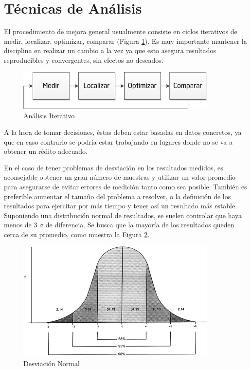 \documentclass[a4paper]{report}
\begin{document}
\section{Técnicas de Análisis}

El procedimiento de mejora general usualmente consiste en ciclos iterativos de medir, localizar, optimizar,
comparar (Figura \ref{fig:cycle}). Es muy importante mantener la disciplina en realizar un cambio a la
vez ya que esto asegura resultados reproducibles y convergentes, sin efectos no deseados.

\begin{figure}[H]
\begin{center}
\includegraphics[width=10cm]{cycle.png}
\caption{Análisis Iterativo}
\label{fig:cycle}
\end{center}
\end{figure}

A la hora de tomar decisiones, éstas deben estar basadas en datos concretos, ya que en caso contrario se podría estar trabajando en lugares donde no se va a obtener un rédito adecuado.

\bigskip

En el caso de tener problemas de desviación en los resultados medidos, es aconsejable obtener un gran número de muestras y utilizar un valor promedio para asegurarse de evitar errores de medición tanto como sea posible. También es preferible aumentar el tamaño del problema a resolver, o la definición de los resultados para ejercitar por más tiempo y tener así un resultado más estable.
Suponiendo una distribución normal de resultados, se suelen controlar que haya menos de 3 $ \sigma $ de diferencia. Se busca que la mayoría de los resultados queden cerca de su promedio, como muestra la Figura \ref{fig:deviation}.

\begin{figure}[H]
\label{fig:deviation}
\begin{center}
\includegraphics[width=10cm]{deviation.png}
\caption{Desviación Normal}
\end{center}
\end{figure}
\end{document}

